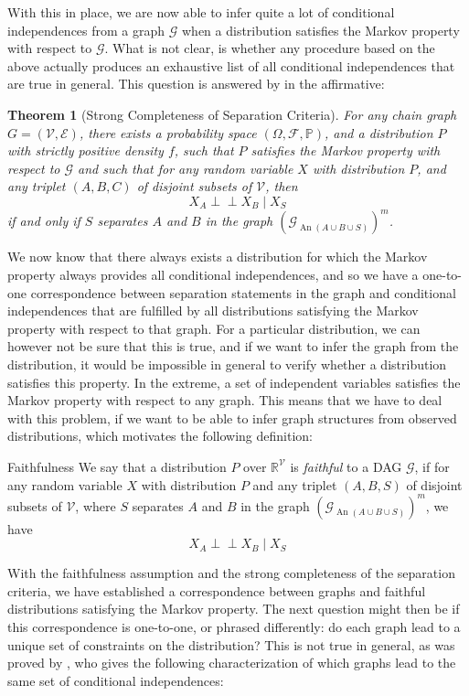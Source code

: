 \documentclass[11pt, a4paper]{memoir}
\theoremstyle{break}
\newtheorem{thm}{Theorem}
\theoremstyle{break}
\theoremstyle{nonumberplain}
\newcommand{\mR}{\mathbb{R}}
\newcommand{\mP}{\mathbb{P}}
\newcommand{\indep}{\perp \!\!\! \perp}
\DeclareMathOperator{\an}{An}
\begin{document}
With this in place, we are now able to infer quite a lot of conditional independences from a graph $\mathcal{G}$ when a distribution satisfies the Markov property with respect to $\mathcal{G}$. What is not clear, is whether any procedure based on the above actually produces an exhaustive list of all conditional independences that are true in general. This question is answered by \cite{Remco} in the affirmative:
\begin{thm}[Strong Completeness of Separation Criteria]\label{separate}
For any chain graph $G=(\mathcal{V},\mathcal{E})$, there exists a probability space $(\Omega, \mathcal{F}, \mP)$, and a distribution $P$ with strictly positive density $f$, such that $P$ satisfies the Markov property with respect to $\mathcal{G}$ and such that for any random variable $X$ with distribution $P$, and any triplet $(A,B,C)$ of disjoint subsets of $\mathcal{V}$, then
$$X_A\indep X_B\mid X_S$$
if and only if $S$ separates $A$ and $B$ in the graph $\left(\mathcal{G}_{\an(A\cup B\cup S)}\right)^m$.
\end{thm}
We now know that there always exists a distribution for which the Markov property always provides all conditional independences, and so we have a one-to-one correspondence between separation statements in the graph and conditional independences that are fulfilled by all distributions satisfying the Markov property with respect to that graph. For a particular distribution, we can however not be sure that this is true, and if we want to infer the graph from the distribution, it would be impossible in general to verify whether a distribution satisfies this property. In the extreme, a set of independent variables satisfies the Markov property with respect to any graph. This means that we have to deal with this problem, if we want to be able to infer graph structures from observed distributions, which motivates the following definition:
\begin{mydefinition}{Faithfulness}
We say that a distribution $P$ over $\mR^{\mathcal{V}}$ is \emph{faithful} to a DAG $\mathcal{G}$, if for any random variable $X$ with distribution $P$ and any triplet $(A,B,S)$ of disjoint subsets of $\mathcal{V}$, where $S$ separates $A$ and $B$ in the graph $\left(\mathcal{G}_{\an(A\cup B\cup S)}\right)^m$, we have
$$X_A\indep X_B\mid X_S$$
\end{mydefinition}
With the faithfulness assumption and the strong completeness of the separation criteria, we have established a correspondence between graphs and faithful distributions satisfying the Markov property. The next question might then be if this correspondence is one-to-one, or phrased differently: do each graph lead to a unique set of constraints on the distribution? This is not true in general, as was proved by \cite{Frydenberg}, who gives the following characterization of which graphs lead to the same set of conditional independences:
\end{document}
